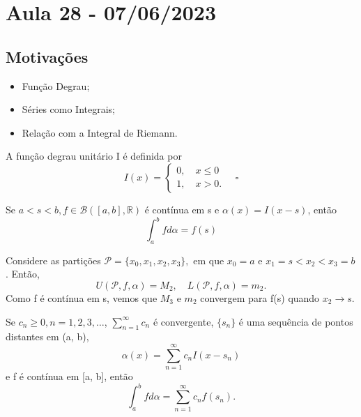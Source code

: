 \documentclass[analysis_notes.tex]{subfiles}
\begin{document}
\section{Aula 28 - 07/06/2023}
\subsection{Motivações}
\begin{itemize}
	\item Função Degrau;
	\item Séries como Integrais;
	\item Relação com a Integral de Riemann.
\end{itemize}
\begin{def*}
	A função degrau unitário I é definida por
	\[
		I(x) = \left\{\begin{array}{ll}
			0,\quad x\leq 0 \\
			1,\quad x > 0.
		\end{array}\right.\quad \square
	\]
\end{def*}
\begin{theorem*}
	Se \(a < s < b, f\in \mathcal{B}([a, b], \mathbb{R})\) é contínua em s e \(\alpha (x) = I(x-s)\), então
	\[
		\int_{a}^{b} f d\alpha = f(s)
	\]
\end{theorem*}
\begin{proof*}
	Considere as partições \(\mathcal{P} = \{x_{0}, x_1, x_2, x_3\},\) em que \(x_{0} = a\) e \(x_1 = s < x_2 < x_3 = b\). Então,
	\[
		U(\mathcal{P}, f, \alpha ) = M_{2}, \quad L(\mathcal{P}, f, \alpha ) = m_{2}.
	\]
	Como f é contínua em s, vemos que \(M_3\) e \(m_2\) convergem para f(s) quando \(x_2\to s.\) \qedsymbol
\end{proof*}
\begin{theorem*}
	Se \(c_{n}\geq 0, n = 1, 2, 3, \dotsc \), \(\sum\limits_{n=1}^{\infty}c_{n}\) é convergente, \(\{s_{n}\}\) é uma sequência de pontos distantes em (a, b),
	\[
		\alpha (x) = \sum\limits_{n=1}^{\infty}c_{n}I(x-s_{n})
	\]
	e f é contínua em [a, b], então
	\[
		\int_{a}^{b}f d\alpha  = \sum\limits_{n=1}^{\infty}c_{n}f(s_{n}).
	\]
\end{theorem*}
\end{document}
